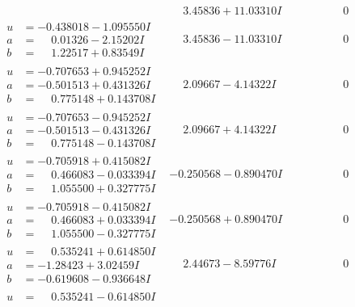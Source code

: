 \documentclass[1p]{elsarticle_modified}
\theoremstyle{definition}
\begin{document}
$$\begin{array}{c|c|c}
 & \phantom{-}3.45836 + 11.03310 I & \phantom{-0.000000 } 0 \\ \hline\begin{aligned}
u &= -0.438018 - 1.095550 I \\
a &= \phantom{-}0.01326 - 2.15202 I \\
b &= \phantom{-}1.22517 + 0.83549 I\end{aligned}
 & \phantom{-}3.45836 - 11.03310 I & \phantom{-0.000000 } 0 \\ \hline\begin{aligned}
u &= -0.707653 + 0.945252 I \\
a &= -0.501513 + 0.431326 I \\
b &= \phantom{-}0.775148 + 0.143708 I\end{aligned}
 & \phantom{-}2.09667 - 4.14322 I & \phantom{-0.000000 } 0 \\ \hline\begin{aligned}
u &= -0.707653 - 0.945252 I \\
a &= -0.501513 - 0.431326 I \\
b &= \phantom{-}0.775148 - 0.143708 I\end{aligned}
 & \phantom{-}2.09667 + 4.14322 I & \phantom{-0.000000 } 0 \\ \hline\begin{aligned}
u &= -0.705918 + 0.415082 I \\
a &= \phantom{-}0.466083 - 0.033394 I \\
b &= \phantom{-}1.055500 + 0.327775 I\end{aligned}
 & -0.250568 - 0.890470 I & \phantom{-0.000000 } 0 \\ \hline\begin{aligned}
u &= -0.705918 - 0.415082 I \\
a &= \phantom{-}0.466083 + 0.033394 I \\
b &= \phantom{-}1.055500 - 0.327775 I\end{aligned}
 & -0.250568 + 0.890470 I & \phantom{-0.000000 } 0 \\ \hline\begin{aligned}
u &= \phantom{-}0.535241 + 0.614850 I \\
a &= -1.28423 + 3.02459 I \\
b &= -0.619608 - 0.936648 I\end{aligned}
 & \phantom{-}2.44673 - 8.59776 I & \phantom{-0.000000 } 0 \\ \hline\begin{aligned}
u &= \phantom{-}0.535241 - 0.614850 I \\

\end{aligned}
\end{array}$$
\end{document}
